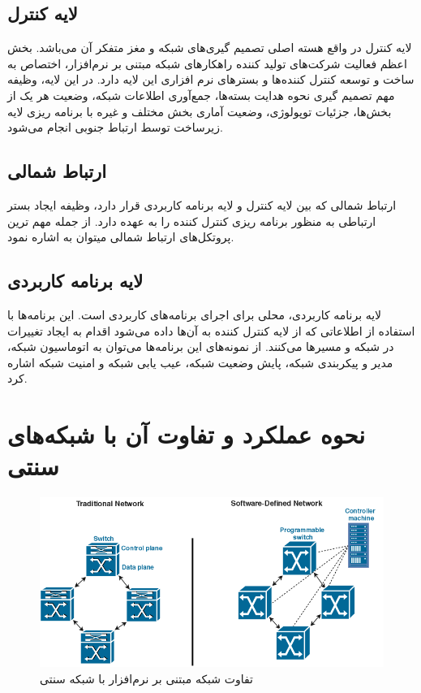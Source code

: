 \subsection{لایه کنترل}
لایه کنترل در واقع هسته اصلی تصمیم گیری‌های شبکه و مغز متفکر آن می‌باشد. بخش اعظم فعالیت شرکت‌های تولید کننده‌ راهکار‌های شبکه‌ مبتنی بر نرم‌افزار، اختصاص به ساخت و توسعه کنترل کننده‌ها و بستر‌های نرم افزاری این لایه دارد. در این لایه، وظیفه مهم تصمیم گیری نحوه هدایت بسته‌ها، جمع‌آوری اطلاعات شبکه، وضعیت هر یک از بخش‌ها، جزئیات توپولوژی، وضعیت آماری بخش مختلف و غیره با برنامه ریزی لایه زیرساخت توسط ارتباط جنوبی انجام می‌شود.

\subsection{ارتباط شمالی}
ارتباط شمالی که بین لایه کنترل و لایه برنامه کاربردی قرار دارد، وظیفه ایجاد بستر ارتباطی به منظور برنامه ریزی کنترل کننده را به عهده دارد. از جمله مهم ترین پروتکل‌های ارتباط شمالی میتوان به  اشاره نمود.

\subsection{لایه برنامه کاربردی}
لایه برنامه کاربردی، محلی برای اجرای برنامه‌های کاربردی است. این برنامه‌ها با استفاده از اطلاعاتی که از لایه کنترل کننده به آن‌ها داده می‌شود اقدام به ایجاد تغییرات در شبکه و مسیر‌ها می‌کنند. از نمونه‌های این برنامه‌ها می‌توان به اتوماسیون شبکه، مدیر و پیکربندی شبکه، پایش وضعیت شبکه، عیب یابی شبکه و امنیت شبکه اشاره کرد.

\section{نحوه عملکرد و تفاوت آن با شبکه‌های سنتی}

\begin{figure}
	\centering
	\includegraphics[scale=0.3]{imgs/sdn_vs_trad.png}
	\caption{تفاوت شبکه مبتنی بر نرم‌افزار با شبکه سنتی}
	\label{fig3}
\end{figure}


